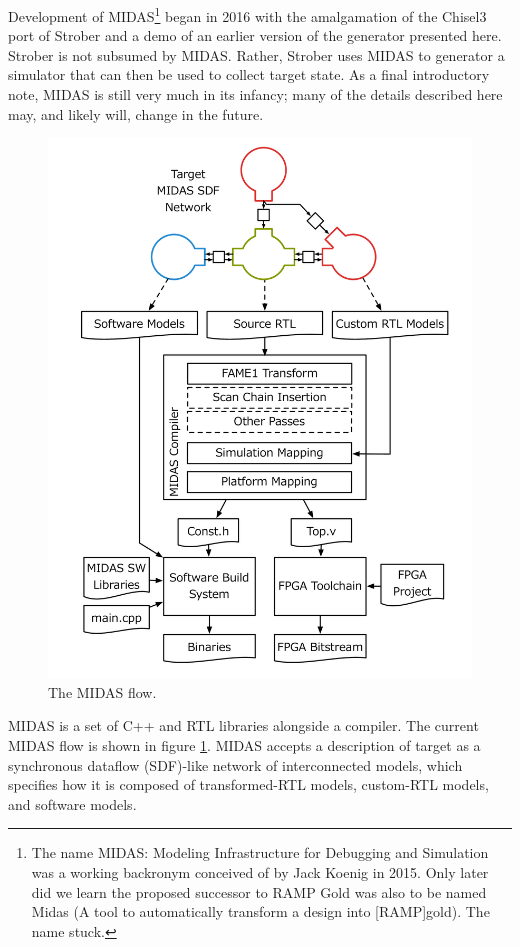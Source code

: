 Development of MIDAS\footnote{The name MIDAS: Modeling Infrastructure for
Debugging and Simulation was a working backronym conceived of by Jack Koenig in
2015. Only later did we learn the proposed successor to RAMP Gold was also to
be named Midas (A tool to automatically transform a design into [RAMP]gold).
The name stuck.} began in 2016 with the amalgamation of the Chisel3 port of
Strober and a demo of an earlier version of the generator presented here.
Strober is not subsumed by MIDAS.  Rather, Strober uses MIDAS to generator a
simulator that can then be used to collect target state.  As a final
introductory note, MIDAS is still very much in its infancy; many of the details
described here may, and likely will, change in the future.

\begin{figure}
	\centering
	\includegraphics[width=16cm]{figures/toolchain.pdf}
    \caption{The MIDAS flow.}
	\label{fig:midas}
\end{figure}

MIDAS is a set of C++ and RTL libraries alongside a compiler. The current MIDAS
flow is shown in figure \ref{fig:midas}. MIDAS accepts a description of target
as a synchronous dataflow (SDF)-like network of interconnected models, which
specifies how it is composed of transformed-RTL models, custom-RTL models, and
software models.

